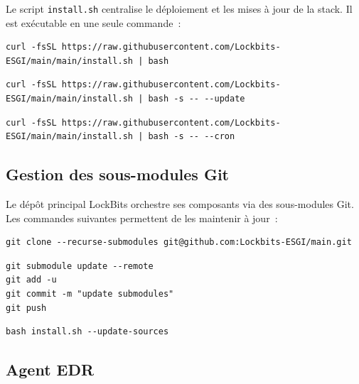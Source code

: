 Le script \texttt{install.sh} centralise le déploiement et les mises à jour
de la stack. Il est exécutable en une seule commande~:

\begin{lstlisting}[language=dockerbash, caption=Installation complète de la stack]
curl -fsSL https://raw.githubusercontent.com/Lockbits-ESGI/main/main/install.sh | bash
\end{lstlisting}

\begin{lstlisting}[language=dockerbash, caption=Mise à jour de la stack]
curl -fsSL https://raw.githubusercontent.com/Lockbits-ESGI/main/main/install.sh | bash -s -- --update
\end{lstlisting}

\begin{lstlisting}[language=dockerbash, caption=Activer la mise à jour automatique (cron)]
curl -fsSL https://raw.githubusercontent.com/Lockbits-ESGI/main/main/install.sh | bash -s -- --cron
\end{lstlisting}

\subsection{Gestion des sous-modules Git}

Le dépôt principal LockBits orchestre ses composants via des sous-modules
Git. Les commandes suivantes permettent de les maintenir à jour~:

\begin{lstlisting}[language=dockerbash, caption=Cloner le projet avec les sous-modules]
git clone --recurse-submodules git@github.com:Lockbits-ESGI/main.git
\end{lstlisting}

\begin{lstlisting}[language=dockerbash, caption=Mettre à jour les sous-modules et publier]
git submodule update --remote
git add -u
git commit -m "update submodules"
git push
\end{lstlisting}

\begin{lstlisting}[language=dockerbash, caption=Mise à jour via le script dédié]
bash install.sh --update-sources
\end{lstlisting}

\subsection{Agent EDR}

